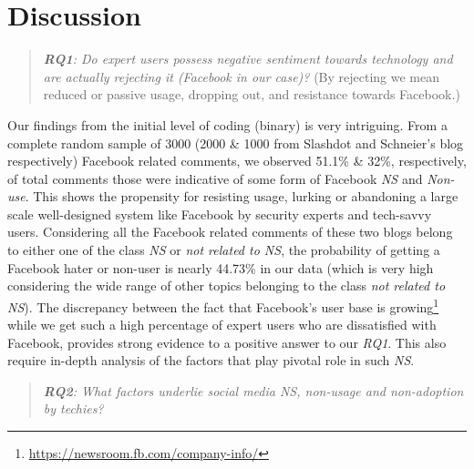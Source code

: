 \section{Discussion}
\label{sec:discussion}
\begin{quote}
\textit{\textbf{RQ1}: Do expert users possess negative sentiment towards technology and are actually rejecting it (Facebook in our case)?} (By rejecting we mean reduced or passive usage, dropping out, and resistance towards Facebook.)
\end{quote}

Our findings from the initial level of coding (binary) is very intriguing. From a complete random sample of 3000 (2000 \& 1000 from Slashdot and Schneier's blog respectively) Facebook related comments, we observed 51.1\% \& 32\%, respectively, of total comments those were indicative of some form of Facebook \textit{NS} and \emph{Non-use}. This shows the propensity for resisting usage, lurking or abandoning a large scale well-designed system like Facebook by security experts and tech-savvy users. Considering all the Facebook related comments of these two blogs belong to either one of the class \textit{NS} or \textit{not related to NS}, the probability of getting a Facebook hater or non-user is nearly 44.73\% in our data (which is very high considering the wide range of other topics belonging to the class \textit{not related to NS}). The discrepancy between the fact that Facebook's user base is growing\footnote{\url{https://newsroom.fb.com/company-info/}}~\cite{lenhart2010social} while we get such a high percentage of expert users who are dissatisfied with Facebook, provides strong evidence to a positive answer to our \emph{RQ1}. This also require in-depth analysis of the factors that play pivotal role in such \textit{NS}. 

\begin{quote}
\textit{\textbf{RQ2}: What factors underlie social media \textit{NS}, non-usage and non-adoption by techies?}
\end{quote}

